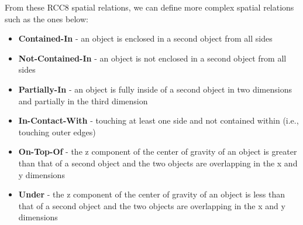 \documentclass[preprint,12pt]{elsarticle}
\newcommand{\sr}[1] {\textbf{#1}}
\begin{document}
From these RCC8 spatial relations, we can define more complex spatial relations such as the ones below:
\begin{itemize}
  \item \sr{Contained-In} - an object is enclosed in a second object from all sides
  \item \sr{Not-Contained-In} - an object is not enclosed in a second object from all sides
  \item \sr{Partially-In} - an object is fully inside of a second object in two dimensions and partially in the third dimension
  \item \sr{In-Contact-With} - touching at least one side and not contained within (i.e., touching outer edges)
  \item \sr{On-Top-Of} - the z component of the center of gravity of an object is greater than that of a second object and the two objects are overlapping in the x and y dimensions
  \item \sr{Under} - the z component of the center of gravity of an object is less than that of a second object and the two objects are overlapping in the x and y dimensions
\end{itemize}
\end{document}
